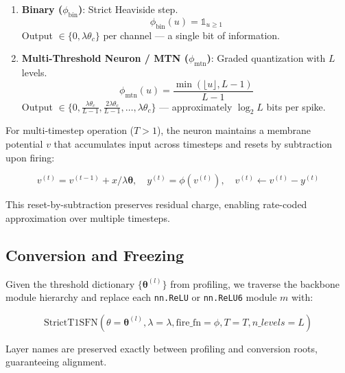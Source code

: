 \documentclass[10pt,conference]{IEEEtran}
\begin{document}
\begin{enumerate}
    \item \textbf{Binary ($\phi_{\text{bin}}$)}: Strict Heaviside step.
    \begin{equation}
        \phi_{\text{bin}}(u) = \mathbb{1}_{u \ge 1}
    \end{equation}
    Output $\in \{0, \lambda\theta_c\}$ per channel — a single bit of information.
    
    \item \textbf{Multi-Threshold Neuron / MTN ($\phi_{\text{mtn}}$)}: Graded quantization with $L$ levels.
    \begin{equation}
        \phi_{\text{mtn}}(u) = \frac{ \min\left( \lfloor u \rfloor, L-1 \right) }{L-1}
    \end{equation}
    Output $\in \{0, \frac{\lambda\theta_c}{L-1}, \frac{2\lambda\theta_c}{L-1}, \dots, \lambda\theta_c\}$ — approximately $\log_2 L$ bits per spike.
\end{enumerate}

For multi-timestep operation ($T > 1$), the neuron maintains a membrane potential $v$ that accumulates input across timesteps and resets by subtraction upon firing:

\begin{equation}
    v^{(t)} = v^{(t-1)} + x/\lambda\boldsymbol{\theta}, \quad y^{(t)} = \phi(v^{(t)}), \quad v^{(t)} \leftarrow v^{(t)} - y^{(t)}
\end{equation}

This reset-by-subtraction preserves residual charge, enabling rate-coded approximation over multiple timesteps.

\subsection{Conversion and Freezing}
\label{sec:conversion_freeze}

Given the threshold dictionary $\{\boldsymbol{\theta}^{(l)}\}$ from profiling, we traverse the backbone module hierarchy and replace each \texttt{nn.ReLU} or \texttt{nn.ReLU6} module $m$ with:

\begin{equation}
    \text{StrictT1SFN}(\theta = \boldsymbol{\theta}^{(l)}, \lambda = \lambda, \text{fire\_fn} = \phi, T = T, n\_levels = L)
\end{equation}

Layer names are preserved exactly between profiling and conversion roots, guaranteeing alignment.
\end{document}
